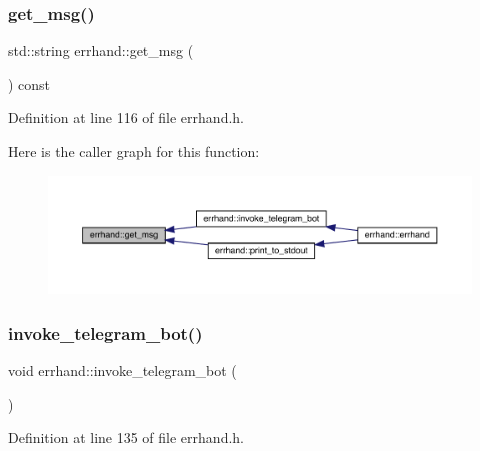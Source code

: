 \subsubsection{\texorpdfstring{get\+\_\+msg()}{get\_msg()}}
{\footnotesize\ttfamily std\+::string errhand\+::get\+\_\+msg (\begin{DoxyParamCaption}{ }\end{DoxyParamCaption}) const\hspace{0.3cm}{\ttfamily [inline]}}



Definition at line 116 of file errhand.\+h.

Here is the caller graph for this function\+:\nopagebreak
\begin{figure}[H]
\begin{center}
\leavevmode
\includegraphics[width=350pt]{classerrhand_a524dfc6821f703329d8801dd3298f33f_icgraph}
\end{center}
\end{figure}
\mbox{\label{classerrhand_adbc86e81b391a68d2bf9a13529c977d3}} 
\subsubsection{\texorpdfstring{invoke\+\_\+telegram\+\_\+bot()}{invoke\_telegram\_bot()}}
{\footnotesize\ttfamily void errhand\+::invoke\+\_\+telegram\+\_\+bot (\begin{DoxyParamCaption}{ }\end{DoxyParamCaption})\hspace{0.3cm}{\ttfamily [inline]}}



Definition at line 135 of file errhand.\+h.

